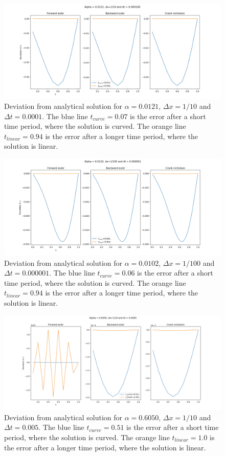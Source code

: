 \documentclass{article}
\begin{document}
\begin{figure}[H]
	\centering
	\includegraphics[width=180mm]{1_10}
	\caption{Deviation from analytical solution for $\alpha=0.0121$, $\Delta x=1/10$ and $\Delta t =0.0001$. The blue line $t_{curve}=0.07$ is the error after a short time period, where the solution is curved. The orange line $t_{linear}=0.94$ is the error after a longer time period, where the solution is linear.}
	\label{fig:1_10}
\end{figure}

\begin{figure}[H]
	\centering
	\includegraphics[width=180mm]{1_100}
	\caption{Deviation from analytical solution for $\alpha=0.0102$, $\Delta x=1/100$ and $\Delta t =0.000001$. The blue line $t_{curve}=0.06$ is the error after a short time period, where the solution is curved. The orange line $t_{linear}=0.94$ is the error after a longer time period, where the solution is linear.}
	\label{fig:1_100}
\end{figure}

\begin{figure}[H]
	\centering
	\includegraphics[width=180mm]{1_10_a}
	\caption{Deviation from analytical solution for $\alpha=0.6050$, $\Delta x=1/10$ and $\Delta t =0.005$. The blue line $t_{curve}=0.51$ is the error after a short time period, where the solution is curved. The orange line $t_{linear}=1.0$ is the error after a longer time period, where the solution is linear. }
	\label{fig:1_10_a}
\end{figure}
\end{document}
